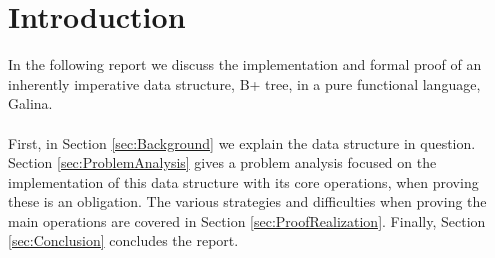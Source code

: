 \section{Introduction}
\label{sec:Introduction}
In the following report we discuss the implementation and formal proof of an inherently imperative data structure, B+ tree, in a pure functional language, Galina. 
\paragraph{}
First, in Section \ref{sec:Background} we explain the data structure in question. Section \ref{sec:ProblemAnalysis} gives a problem analysis focused on the implementation of this data structure with its core operations, when proving these is an obligation. The various strategies and difficulties when proving the main operations are covered in Section \ref{sec:ProofRealization}. Finally, Section \ref{sec:Conclusion} concludes the report.